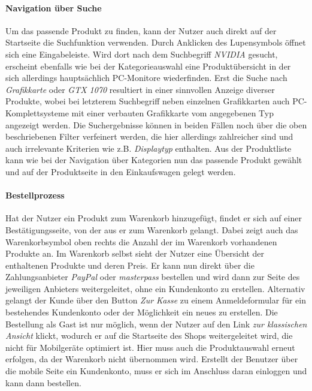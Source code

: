 \documentclass[	12pt, 
				a4paper, 
				BCOR=10mm, %
				DIV=12, 
				parskip=half, %
				headings=small, %
				twoside, %
				ngerman,
				bibliography=totoc,index=totoc, listof=totoc,
				numbers=noendperiod
				]{scrbook} %
\theoremstyle{plain}%
\theoremstyle{definition}
\theoremstyle{remark}
\begin{document}
\paragraph{Navigation über Suche} Um das passende Produkt zu finden, kann der Nutzer auch direkt auf der Startseite die Suchfunktion verwenden. Durch Anklicken des Lupensymbols öffnet sich eine Eingabeleiste. Wird dort nach dem Suchbegriff \textit{NVIDIA} gesucht, erscheint ebenfalls wie bei der Kategorieauswahl eine Produktübersicht in der sich allerdings hauptsächlich PC-Monitore wiederfinden. Erst die Suche nach \textit{Grafikkarte} oder \textit{GTX 1070} resultiert in einer sinnvollen Anzeige diverser Produkte, wobei bei letzterem Suchbegriff neben einzelnen Grafikkarten auch PC-Komplettsysteme mit einer verbauten Grafikkarte vom angegebenen Typ angezeigt werden. Die Suchergebnisse können in beiden Fällen noch über die oben beschriebenen Filter verfeinert werden, die hier allerdings zahlreicher sind und auch irrelevante Kriterien wie z.B. \textit{Displaytyp} enthalten. Aus der Produktliste kann wie bei der Navigation über Kategorien nun das passende Produkt gewählt und auf der Produktseite in den Einkaufswagen gelegt werden.

\paragraph{Bestellprozess} Hat der Nutzer ein Produkt zum Warenkorb hinzugefügt, findet er sich auf einer Bestätigungsseite, von der aus er zum Warenkorb gelangt. Dabei zeigt auch das Warenkorbsymbol oben rechts die Anzahl der im Warenkorb vorhandenen Produkte an. Im Warenkorb selbst sieht der Nutzer eine Übersicht der enthaltenen Produkte und deren Preis. Er kann nun direkt über die Zahlungsanbieter \textit{PayPal} oder \textit{masterpass} bestellen und wird dann zur Seite des jeweiligen Anbieters weitergeleitet, ohne ein Kundenkonto zu erstellen. Alternativ gelangt der Kunde über den Button \textit{Zur Kasse} zu einem Anmeldeformular für ein bestehendes Kundenkonto oder der Möglichkeit ein neues zu erstellen. Die Bestellung als Gast ist nur möglich, wenn der Nutzer auf den Link \textit{zur klassischen Ansicht} klickt, wodurch er auf die Startseite des Shops weitergeleitet wird, die nicht für Mobilgeräte optimiert ist. Hier muss auch die Produktauswahl erneut erfolgen, da der Warenkorb nicht übernommen wird. Erstellt der Benutzer über die mobile Seite ein Kundenkonto, muss er sich im Anschluss daran einloggen und kann dann bestellen.
\end{document}
